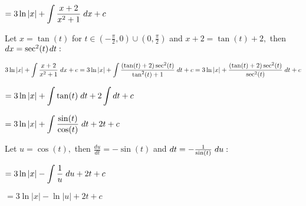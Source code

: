 \documentclass{article}
\begin{document}
 \begin{center}
  \( \displaystyle = 3\ln|x| + \int \frac{x+2}{x^2 + 1} \hspace{0.1cm} dx + c\)
 \end{center}
\vspace{0.3cm}
Let $x = \tan(t)$ for $t \in (-\frac{\pi}{2}, 0) \cup (0, \frac{\pi}{2})$ and $x + 2 = \tan(t) + 2,$ then $dx = \sec^2(t)\hspace{0.04cm}dt:$
\vspace{0.3cm}
\begin{center}
  \( \displaystyle 3\ln|x| + \int \frac{x+2}{x^2 + 1} \hspace{0.1cm} dx + c = 3\ln|x| + \int \frac{(\tan(t) + 2)\sec^2(t)}{\tan^2(t) + 1}\hspace{0.1cm}dt + c = 3\ln|x| + \frac{(\tan(t) + 2)\sec^2(t)}{\sec^2(t)}\hspace{0.1cm}dt + c\)
 \end{center}
 \begin{center}
  \( \displaystyle = 3\ln|x| + \int\tan(t) \hspace{0.1cm}dt + 2\int dt + c\) 
 \end{center}
 \begin{center}
  \( \displaystyle = 3\ln|x| + \int\frac{\sin(t)}{\cos(t)}\hspace{0.1cm}dt + 2t + c\) 
 \end{center}
 Let $u = \cos(t),$ then $\frac{du}{dt} = -\sin(t)$ and $dt = -\frac{1}{\sin(t)}\hspace{0.1cm} du:$
 \begin{center}
  \( \displaystyle = 3\ln|x| - \int\frac{1}{u} \hspace{0.1cm}du + 2t + c\) 
 \end{center}

 \begin{center}
  \( \displaystyle = 3\ln|x| - \ln|u| + 2t + c\) 
 \end{center}
\end{document}
